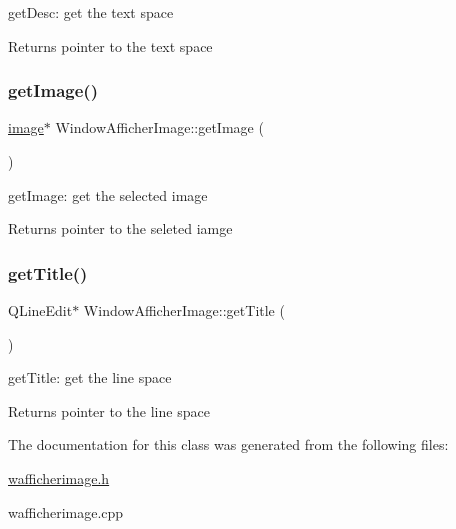 get\+Desc\+: get the text space 

\begin{DoxyReturn}{Returns}
pointer to the text space 
\end{DoxyReturn}
\mbox{\label{class_window_afficher_image_ac8a0d10bb80e99fda8ca7eaf77b072ea}} 
\subsubsection{\texorpdfstring{get\+Image()}{getImage()}}
{\footnotesize\ttfamily \hyperlink{classimage}{image}$\ast$ Window\+Afficher\+Image\+::get\+Image (\begin{DoxyParamCaption}{ }\end{DoxyParamCaption})\hspace{0.3cm}{\ttfamily [inline]}}



get\+Image\+: get the selected image 

\begin{DoxyReturn}{Returns}
pointer to the seleted iamge 
\end{DoxyReturn}
\mbox{\label{class_window_afficher_image_a2af473bca8e2be4e6aaadaa92b7da192}} 
\subsubsection{\texorpdfstring{get\+Title()}{getTitle()}}
{\footnotesize\ttfamily Q\+Line\+Edit$\ast$ Window\+Afficher\+Image\+::get\+Title (\begin{DoxyParamCaption}{ }\end{DoxyParamCaption})\hspace{0.3cm}{\ttfamily [inline]}}



get\+Title\+: get the line space 

\begin{DoxyReturn}{Returns}
pointer to the line space 
\end{DoxyReturn}


The documentation for this class was generated from the following files\+:\begin{DoxyCompactItemize}
\item 
\hyperlink{wafficherimage_8h}{wafficherimage.\+h}\item 
wafficherimage.\+cpp\end{DoxyCompactItemize}
